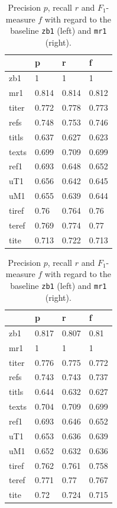 \begin{table}[t]
  \hfil
  \begin{tabular}{llll}
    \toprule
    {} &      p &      r &      f \\
    \midrule
    zb1   &      1 &      1 &      1 \\
    mr1   &  0.814 &  0.814 &  0.812 \\
    titer &  0.772 &  0.778 &  0.773 \\
    refs  &  0.748 &  0.753 &  0.746 \\
    titls &  0.637 &  0.627 &  0.623 \\
    texts &  0.699 &  0.709 &  0.699 \\
    ref1  &  0.693 &  0.648 &  0.652 \\
    uT1   &  0.656 &  0.642 &  0.645 \\
    uM1   &  0.655 &  0.639 &  0.644 \\
    tiref &   0.76 &  0.764 &   0.76 \\
    teref &  0.769 &  0.774 &   0.77 \\
    tite  &  0.713 &  0.722 &  0.713 \\
    \bottomrule
  \end{tabular}
  \hfil
  \begin{tabular}{llll}
    \toprule
    {} &      p &      r &      f \\
    \midrule
    zb1   &  0.817 &  0.807 &   0.81 \\
    mr1   &      1 &      1 &      1 \\
    titer &  0.776 &  0.775 &  0.772 \\
    refs  &  0.743 &  0.743 &  0.737 \\
    titls &  0.644 &  0.632 &  0.627 \\
    texts &  0.704 &  0.709 &  0.699 \\
    ref1  &  0.693 &  0.646 &  0.652 \\
    uT1   &  0.653 &  0.636 &  0.639 \\
    uM1   &  0.652 &  0.632 &  0.636 \\
    tiref &  0.762 &  0.761 &  0.758 \\
    teref &  0.771 &   0.77 &  0.767 \\
    tite  &   0.72 &  0.724 &  0.715 \\
    \bottomrule
  \end{tabular}
  \hfil
  \caption{Precision $p$, recall $r$ and $F_1$-measure $f$ with regard to
    the baseline \texttt{zb1} (left) and \texttt{mr1} (right).} \label{tb1}
\end{table}
